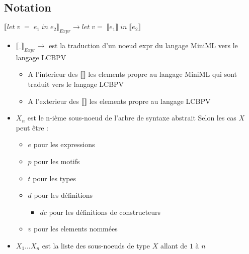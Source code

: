 \documentclass[
  12pt,
]{article}
\providecommand{\tightlist}{%
  \setlength{\itemsep}{0pt}\setlength{\parskip}{0pt}}
\begin{document}
\newcommand{\translateNode}[2]{\llbracket #1 \rrbracket_{#2}}
\newcommand{\translateResult}[1]{\llbracket #1 \rrbracket}
\newcommand{\isElemMiniML}[1]{\; \textcolor{Maroon}{#1} \;}
\newcommand{\isElemLCBPV}[1]{\textcolor{ForestGreen}{#1}}
\newcommand{\spaced}[1]{\; #1 \;}
\newcommand{\Tab}{\quad \quad \quad \quad \quad \quad \;}
\hypertarget{notation}{%
  \subsection{Notation}\label{notation}}
$ \translateNode{let \; v \; = \; e_1 \; in \; e_2}{Expr}  \rightarrow let \; v = \; \translateResult{e_1} \; in \; \translateResult{e_2}$
\begin{itemize}
  \tightlist
  \item
        $\translateNode{\_}{Expr}  \rightarrow $ est la traduction d'un noeud expr du langage MiniML vers le langage LCBPV
        \begin{itemize}
          \tightlist
          \item
                A l'interieur des $\translateResult{}$  les elements propre au langage MiniML qui sont traduit vers le langage LCBPV
          \item
                A l'exterieur des $\translateResult{}$  les elements propre au langage LCBPV
        \end{itemize}
  \item
        $X_n$ est le n-ième sous-noeud de l'arbre de syntaxe abstrait \newline
        Selon les cas $X$ peut être :
        \begin{itemize}
          \tightlist
          \item
                $e$ pour les expressions
          \item
                $p$ pour les motifs
          \item
                $t$ pour les types
          \item
                $d$ pour les définitions
                \begin{itemize}
                  \tightlist
                  \item
                        $dc$ pour les définitions de constructeurs
                \end{itemize}
          \item
                $v$ pour les elements nommées
        \end{itemize}
  \item
        $X_1 \dots X_n$ est la liste des sous-noeuds de type $X$ allant de $1$ à $n$
\end{itemize}
\end{document}
